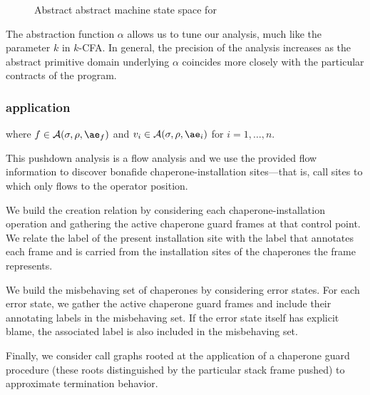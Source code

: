 \begin{figure}
\caption{Abstract abstract machine state space for \chapcalc}
\end{figure}

The abstraction function $\alpha$ allows us to tune our analysis, much like the parameter $k$ in $k$-CFA.
In general, the precision of the analysis increases as the abstract primitive domain underlying $\alpha$ coincides more closely with the particular contracts of the program.

\subsubsection{application}

\noindent
{}

\noindent
where $f\in\A{\sigma}{\rho}{\ae_f}$ and $v_i\in\A{\sigma}{\rho}{\ae_i}$ for $i=1,\dots,n$.



This pushdown analysis is a flow analysis and we use the provided flow information to discover bonafide chaperone-installation sites---that is, call sites to which only  flows to the operator position.

We build the creation relation by considering each chaperone-installation operation and gathering the active chaperone guard frames at that control point.
We relate the label of the present installation site with the label that annotates each frame and is carried from the installation sites of the chaperones the frame represents.

We build the misbehaving set of chaperones by considering error states.
For each error state, we gather the active chaperone guard frames and include their annotating labels in the misbehaving set.
If the error state itself has explicit blame, the associated label is also included in the misbehaving set.

Finally, we consider call graphs rooted at the application of a chaperone guard procedure (these roots distinguished by the particular stack frame pushed) to approximate termination behavior.


